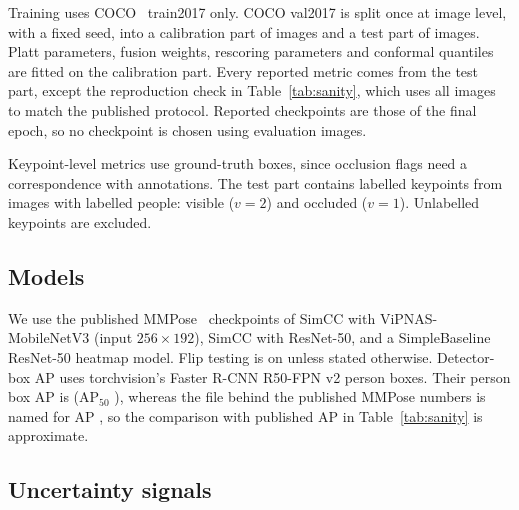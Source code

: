 \documentclass[preprint,11pt]{elsarticle}
\begin{document}
Training uses COCO~\cite{lin2014coco} train2017 only. COCO val2017 is split once at image level,
with a fixed seed, into a calibration part of \numCalImages{} images and a test part of
\numTestImages{} images. Platt parameters, fusion weights, rescoring parameters and conformal
quantiles are fitted on the calibration part. Every reported metric comes from the test part,
except the reproduction check in Table~\ref{tab:sanity}, which uses all images to match the
published protocol. Reported checkpoints are those of the final epoch, so no checkpoint is chosen
using evaluation images.

Keypoint-level metrics use ground-truth boxes, since occlusion flags need a correspondence with
annotations. The test part contains \numKptTest{} labelled keypoints from \numImgKptTest{} images
with labelled people: \numVisTest{} visible ($v{=}2$) and \numOccTest{} occluded ($v{=}1$).
Unlabelled keypoints are excluded.

\subsection{Models}

We use the published MMPose~\cite{mmpose2020} checkpoints of SimCC with ViPNAS-MobileNetV3
(input $256\times192$), SimCC with ResNet-50, and a SimpleBaseline ResNet-50 heatmap model. Flip
testing is on unless stated otherwise. Detector-box AP uses torchvision's Faster R-CNN R50-FPN v2
person boxes. Their person box AP is \detBoxAp{} (AP$_{50}$ \detBoxApFifty{}), whereas the file
behind the published MMPose numbers is named for AP \detBoxApPublished{}, so the comparison with
published AP in Table~\ref{tab:sanity} is approximate.

\subsection{Uncertainty signals}\label{sec:signals}
\end{document}
